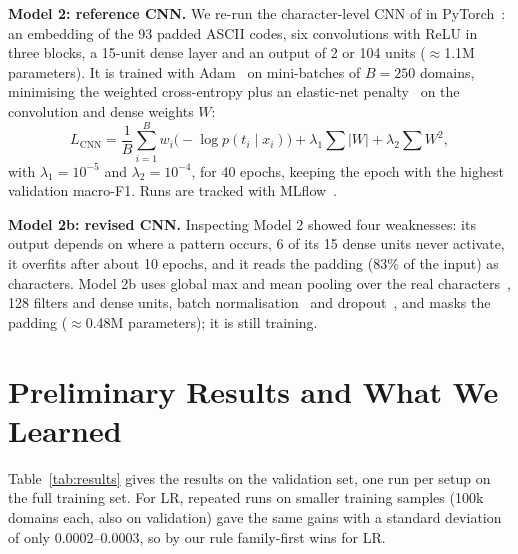 \documentclass[11pt]{article}
\begin{document}
\textbf{Model 2: reference CNN.} We re-run the character-level CNN of
\citet{gregorio2024incremental} in PyTorch~\cite{paszke2019pytorch}: an embedding
of the 93 padded ASCII codes, six convolutions with ReLU in three blocks, a
15-unit dense layer and an output of 2 or 104 units ($\approx$1.1M parameters).
It is trained with Adam~\cite{kingma2015adam} on mini-batches of $B = 250$
domains, minimising the weighted cross-entropy plus an elastic-net
penalty~\cite{zou2005elasticnet} on the convolution and dense weights $W$:
\begin{equation}
L_{\text{CNN}} = \frac{1}{B}\sum_{i=1}^{B} w_i \big(-\log p(t_i \mid x_i)\big)
+ \lambda_1 \sum |W| + \lambda_2 \sum W^2,
\end{equation}
with $\lambda_1 = 10^{-5}$ and $\lambda_2 = 10^{-4}$, for 40 epochs, keeping the epoch
with the highest validation macro-F1. Runs are tracked with
MLflow~\cite{zaharia2018mlflow}.

\textbf{Model 2b: revised CNN.} Inspecting Model 2 showed four weaknesses: its
output depends on where a pattern occurs, 6 of its 15 dense units never activate,
it overfits after about 10 epochs, and it reads the padding (83\% of the input)
as characters. Model 2b uses global max and mean pooling over the real
characters~\cite{kim2014cnn}, 128 filters and dense units, batch
normalisation~\cite{ioffe2015batchnorm} and dropout~\cite{srivastava2014dropout},
and masks the padding ($\approx$0.48M parameters); it is still training.

\section{Preliminary Results and What We Learned}
Table~\ref{tab:results} gives the results on the validation set, one run per setup
on the full training set. For LR, repeated runs on smaller training samples
(100k domains each, also on validation) gave the same gains with a standard
deviation of only 0.0002--0.0003, so by our rule family-first wins for LR.
\end{document}
